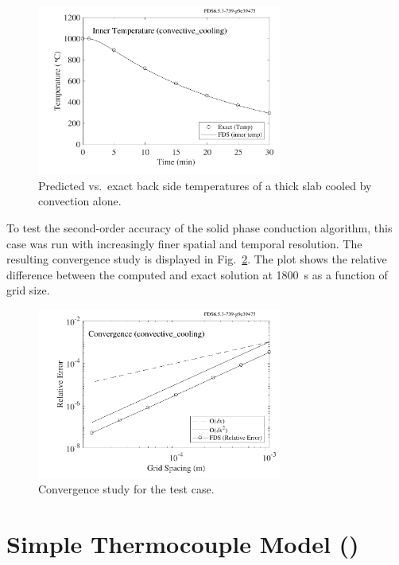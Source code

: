 \documentclass[11pt]{book}
\begin{document}
\begin{figure}[ht]
\centering
\includegraphics[height=2.2in]{SCRIPT_FIGURES/convective_cooling}
\caption[The  test case]{Predicted vs.~exact back side temperatures of a thick slab cooled by convection alone.}
\label{convective_cooling_fig}
\end{figure}

To test the second-order accuracy of the solid phase conduction algorithm, this case was run with increasingly finer spatial and temporal resolution. The resulting convergence study is displayed in Fig.~\ref{convective_cooling_convergence}. The plot shows the relative difference between the computed and exact solution at 1800~s as a function of grid size.

\begin{figure}[ht]
\centering
\includegraphics[height=2.2in]{SCRIPT_FIGURES/convective_cooling_error}
\caption[Convergence study for the  test case]{Convergence study for the  test case.}
\label{convective_cooling_convergence}
\end{figure}



\section{Simple Thermocouple Model (\texorpdfstring{}{thermocouples})}
\label{thermocouples}
\end{document}
